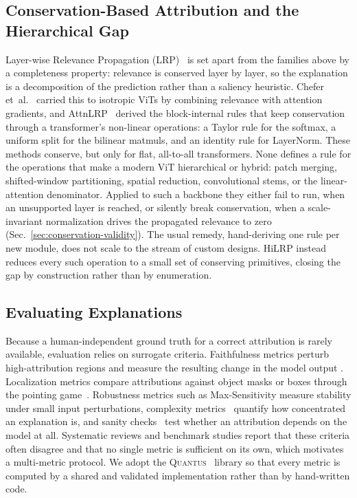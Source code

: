 \documentclass[lettersize,journal]{IEEEtran}
\begin{document}
\subsection{Conservation-Based Attribution and the Hierarchical Gap}
\label{sec:related-lrp}
Layer-wise Relevance Propagation (LRP)~\cite{bach2015lrp} is set apart from the
families above by a completeness property: relevance is conserved layer by
layer, so the explanation is a decomposition of the prediction rather than a
saliency heuristic. Chefer et~al.~\cite{chefer2021transformer} carried this to
isotropic ViTs by combining relevance with attention gradients, and
AttnLRP~\cite{achtibat2024attnlrp} derived the block-internal rules that keep
conservation through a transformer's non-linear operations: a Taylor rule for
the softmax, a uniform split for the bilinear matmuls, and an identity rule for
LayerNorm. These methods conserve, but only for flat, all-to-all transformers.
None defines a rule for the operations that make a modern ViT hierarchical or
hybrid: patch merging, shifted-window partitioning, spatial reduction,
convolutional stems, or the linear-attention denominator. Applied to such a
backbone they either fail to run, when an unsupported layer is reached, or
silently break conservation, when a scale-invariant normalization drives the
propagated relevance to zero (Sec.~\ref{sec:conservation-validity}). The usual
remedy, hand-deriving one rule per new module, does not scale to the stream of
custom designs. HiLRP instead reduces every such operation to a small set of
conserving primitives, closing the gap by construction rather than by
enumeration.

\subsection{Evaluating Explanations}
Because a human-independent ground truth for a correct attribution is rarely
available, evaluation relies on surrogate criteria. Faithfulness metrics perturb
high-attribution regions and measure the resulting change in the model output
\cite{bhatt2020faithfulness,alvarez2018robustness,rong2022road}. Localization
metrics compare attributions against object masks or boxes through the pointing
game~\cite{zhang2018pointing}. Robustness metrics such as Max-Sensitivity
\cite{yeh2019sensitivity} measure stability under small input perturbations,
complexity metrics~\cite{chalasani2020sparseness} quantify how concentrated an
explanation is, and sanity checks~\cite{adebayo2018sanity} test whether an
attribution depends on the model at all. Systematic reviews and benchmark studies
\cite{nauta2023anecdotal,bodria2023benchmarking} report that these criteria
often disagree and that no single metric is sufficient on its own, which
motivates a multi-metric protocol. We adopt the
\textsc{Quantus}~\cite{hedstrom2023quantus} library so that every metric is
computed by a shared and validated implementation rather than by hand-written
code.
\end{document}
